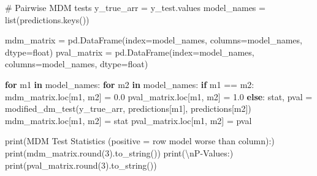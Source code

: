 \documentclass[
  letterpaper,
  DIV=11,
  numbers=noendperiod]{scrartcl}
\newenvironment{Shaded}{\begin{snugshade}}{\end{snugshade}}
\newcommand{\BuiltInTok}[1]{\textcolor[rgb]{0.00,0.23,0.31}{#1}}
\newcommand{\CharTok}[1]{\textcolor[rgb]{0.13,0.47,0.30}{#1}}
\newcommand{\CommentTok}[1]{\textcolor[rgb]{0.37,0.37,0.37}{#1}}
\newcommand{\ControlFlowTok}[1]{\textcolor[rgb]{0.00,0.23,0.31}{\textbf{#1}}}
\newcommand{\DecValTok}[1]{\textcolor[rgb]{0.68,0.00,0.00}{#1}}
\newcommand{\FloatTok}[1]{\textcolor[rgb]{0.68,0.00,0.00}{#1}}
\newcommand{\KeywordTok}[1]{\textcolor[rgb]{0.00,0.23,0.31}{\textbf{#1}}}
\newcommand{\NormalTok}[1]{\textcolor[rgb]{0.00,0.23,0.31}{#1}}
\newcommand{\OperatorTok}[1]{\textcolor[rgb]{0.37,0.37,0.37}{#1}}
\newcommand{\StringTok}[1]{\textcolor[rgb]{0.13,0.47,0.30}{#1}}
\begin{document}
\begin{Shaded}
\begin{Highlighting}[]
\CommentTok{\# Pairwise MDM tests}
\NormalTok{y\_true\_arr }\OperatorTok{=}\NormalTok{ y\_test.values}
\NormalTok{model\_names }\OperatorTok{=} \BuiltInTok{list}\NormalTok{(predictions.keys())}

\NormalTok{mdm\_matrix }\OperatorTok{=}\NormalTok{ pd.DataFrame(index}\OperatorTok{=}\NormalTok{model\_names, columns}\OperatorTok{=}\NormalTok{model\_names, dtype}\OperatorTok{=}\BuiltInTok{float}\NormalTok{)}
\NormalTok{pval\_matrix }\OperatorTok{=}\NormalTok{ pd.DataFrame(index}\OperatorTok{=}\NormalTok{model\_names, columns}\OperatorTok{=}\NormalTok{model\_names, dtype}\OperatorTok{=}\BuiltInTok{float}\NormalTok{)}

\ControlFlowTok{for}\NormalTok{ m1 }\KeywordTok{in}\NormalTok{ model\_names:}
    \ControlFlowTok{for}\NormalTok{ m2 }\KeywordTok{in}\NormalTok{ model\_names:}
        \ControlFlowTok{if}\NormalTok{ m1 }\OperatorTok{==}\NormalTok{ m2:}
\NormalTok{            mdm\_matrix.loc[m1, m2] }\OperatorTok{=} \FloatTok{0.0}
\NormalTok{            pval\_matrix.loc[m1, m2] }\OperatorTok{=} \FloatTok{1.0}
        \ControlFlowTok{else}\NormalTok{:}
\NormalTok{            stat, pval }\OperatorTok{=}\NormalTok{ modified\_dm\_test(y\_true\_arr, predictions[m1], predictions[m2])}
\NormalTok{            mdm\_matrix.loc[m1, m2] }\OperatorTok{=}\NormalTok{ stat}
\NormalTok{            pval\_matrix.loc[m1, m2] }\OperatorTok{=}\NormalTok{ pval}

\BuiltInTok{print}\NormalTok{(}\StringTok{\textquotesingle{}MDM Test Statistics (positive = row model worse than column):\textquotesingle{}}\NormalTok{)}
\BuiltInTok{print}\NormalTok{(mdm\_matrix.}\BuiltInTok{round}\NormalTok{(}\DecValTok{3}\NormalTok{).to\_string())}
\BuiltInTok{print}\NormalTok{(}\StringTok{\textquotesingle{}}\CharTok{\textbackslash{}n}\StringTok{P{-}Values:\textquotesingle{}}\NormalTok{)}
\BuiltInTok{print}\NormalTok{(pval\_matrix.}\BuiltInTok{round}\NormalTok{(}\DecValTok{3}\NormalTok{).to\_string())}
\end{Highlighting}
\end{Shaded}
\end{document}
